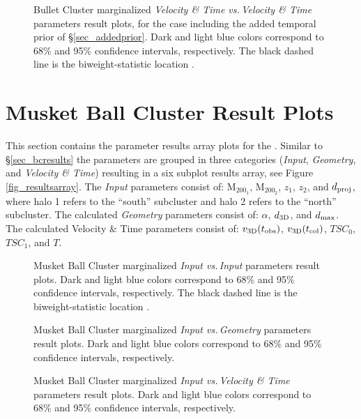 \documentclass[12pt]{emulateapj}
\begin{document}
\begin{figure}
\caption{Bullet Cluster marginalized \emph{Velocity \& Time vs.\,Velocity \& Time} parameters result plots, for the case including the added temporal prior of \S\ref{sec_addedprior}.  Dark and light blue colors correspond to 68\% and 95\% confidence intervals, respectively.  The black dashed line is the biweight-statistic location \citep{Beers:1982dp}.
\label{fig_bc_vtvt}}
\end{figure}
\clearpage


\section{Musket Ball Cluster Result Plots}\label{sec_mbcresults}

This section contains the parameter results array plots for the .
Similar to \S\ref{sec_bcresults} the parameters are grouped in three categories (\emph{Input}, \emph{Geometry}, and \emph{Velocity \& Time}) resulting in a six subplot results array, see Figure \ref{fig_resultsarray}.
The \emph{Input} parameters consist of: M$_{200_1}$, M$_{200_2}$, $z_1$, $z_2$,	and $d_{\rm proj}$, where halo 1 refers to the ``south'' subcluster and halo 2 refers to the ``north'' subcluster.
The calculated \emph{Geometry} parameters consist of: $\alpha$, $d_{\rm 3D}$, and $d_{\rm max}$.
The calculated Velocity \& Time parameters consist of:  $v_{\rm 3D}(t_{\rm obs})$, $v_{\rm 3D}(t_{\rm col})$, $TSC_0$, $TSC_1$, and $T$.

\begin{figure}[b]
\caption{Musket Ball Cluster marginalized \emph{Input vs.\,Input} parameters result plots.  Dark and light blue colors correspond to 68\% and 95\% confidence intervals, respectively.  The black dashed line is the biweight-statistic location \citep{Beers:1982dp}.
\label{musket_inin}}
\end{figure}

\begin{figure}
\caption{Musket Ball Cluster marginalized \emph{Input vs.\,Geometry} parameters result plots.  Dark and light blue colors correspond to 68\% and 95\% confidence intervals, respectively.
\label{musket_ingeo}}
\end{figure}

\begin{figure}
\caption{Musket Ball Cluster marginalized \emph{Input vs.\,Velocity \& Time} parameters result plots.  Dark and light blue colors correspond to 68\% and 95\% confidence intervals, respectively.
\label{musket_invt}}
\end{figure}
\end{document}

